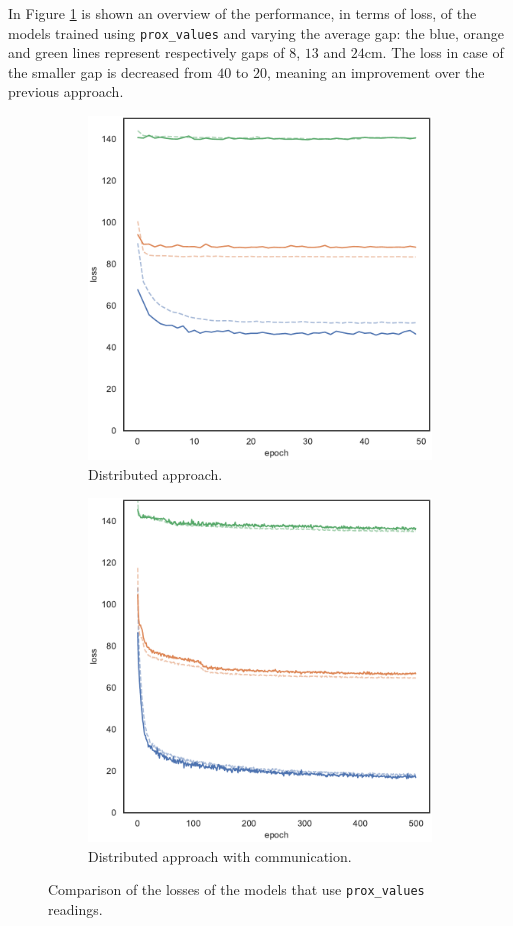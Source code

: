 In Figure \ref{fig:commlossprox_values} is shown an overview of the performance, 
in terms of loss, of the models trained using \texttt{prox\_values} and varying the 
average gap: the blue, orange and green lines represent respectively gaps of $8$, 
$13$ and $24$\gls{cm}.
The loss in case of the smaller gap is decreased from $40$ to $20$, meaning an 
improvement over the previous approach.
\begin{figure}[!htb]
	\begin{center}
		\begin{subfigure}[h]{0.49\textwidth}
			\centering
			\includegraphics[width=.7\textwidth]{contents/images/task1-comm/loss-distributed-prox_values@copy}
			\caption{Distributed approach.}
		\end{subfigure}
		\hfill
		\begin{subfigure}[h]{0.49\textwidth}
			\centering
			\includegraphics[width=.7\textwidth]{contents/images/task1-comm/loss-communication-prox_values@copy}
			\caption{Distributed approach with communication.}
		\end{subfigure}	
	\end{center}
\vspace{-0.5cm}
	\caption{Comparison of the losses of the models that use \texttt{prox\_values} 
		readings.}
	\label{fig:commlossprox_values}
\end{figure}

